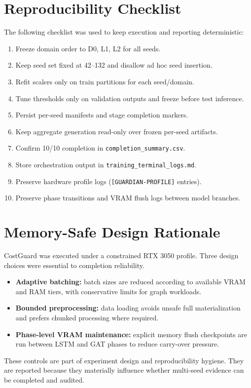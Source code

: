 \documentclass[10pt,twocolumn]{article}
\begin{document}
\FloatBarrier
\section{Reproducibility Checklist}
The following checklist was used to keep execution and reporting deterministic:
\begin{enumerate}
\item Freeze domain order to D0, L1, L2 for all seeds.
\item Keep seed set fixed at 42--132 and disallow ad hoc seed insertion.
\item Refit scalers only on train partitions for each seed/domain.
\item Tune thresholds only on validation outputs and freeze before test inference.
\item Persist per-seed manifests and stage completion markers.
\item Keep aggregate generation read-only over frozen per-seed artifacts.
\item Confirm 10/10 completion in \texttt{completion\_summary.csv}.
\item Store orchestration output in \texttt{training\_terminal\_logs.md}.
\item Preserve hardware profile logs (\texttt{[GUARDIAN-PROFILE]} entries).
\item Preserve phase transitions and VRAM flush logs between model branches.
\end{enumerate}

\FloatBarrier
\section{Memory-Safe Design Rationale}
CostGuard was executed under a constrained RTX 3050 profile. Three design choices were essential to completion reliability.
\begin{itemize}
\item \textbf{Adaptive batching:} batch sizes are reduced according to available VRAM and RAM tiers, with conservative limits for graph workloads.
\item \textbf{Bounded preprocessing:} data loading avoids unsafe full materialization and prefers chunked processing where required.
\item \textbf{Phase-level VRAM maintenance:} explicit memory flush checkpoints are run between LSTM and GAT phases to reduce carry-over pressure.
\end{itemize}

These controls are part of experiment design and reproducibility hygiene. They are reported because they materially influence whether multi-seed evidence can be completed and audited.
\end{document}
